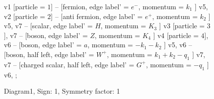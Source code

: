 \documentclass{revtex4}
\begin{document}
\begin{figure}[!htb]
\begin{center}
{    %
v1 [particle = \(1\)] -- [fermion, edge label' = \(e^{-}\), momentum = \(k_{1}\) ] v5, 
v2 [particle = \(2\)] -- [anti fermion, edge label' = \(e^{+}\), momentum = \(k_{2}\) ] v5, 
v7 -- [scalar, edge label' = \(H\), momentum = \(K_{3}\) ] v3 [particle = \(3\)], 
v7 -- [boson, edge label' = \(Z\), momentum = \(K_{4}\) ] v4 [particle = \(4\)], 
v6 -- [boson, edge label' = \(a\), momentum = \(-k_{1} - k_{2}\) ] v5, 
v6 -- [boson, half left, edge label' = \(W^{+}\), momentum = \(k_{1} + k_{2} - q_{1}\) ] v7, 
v7 -- [charged scalar, half left, edge label' = \(G^{+}\), momentum = \(-q_{1}\) ] v6, 
};
\end{center}
\caption{Diagram1, Sign: 1, Symmetry factor: 1}
\end{figure}
\newpage
\end{document}
